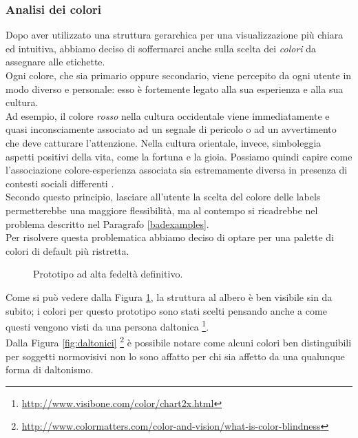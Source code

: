 \documentclass[12pt]{article} %
\begin{document}
\subsubsection{Analisi dei colori}
Dopo aver utilizzato una struttura gerarchica per una visualizzazione più chiara ed intuitiva, abbiamo deciso di soffermarci anche sulla scelta dei \emph{colori} da assegnare alle etichette.\\
Ogni colore, che sia primario oppure secondario, viene percepito da ogni utente in modo diverso e personale: esso è fortemente legato alla sua esperienza e alla sua cultura.\\
Ad esempio, il colore \emph{rosso} nella cultura occidentale viene immediatamente e quasi inconsciamente associato ad un segnale di pericolo o ad un avvertimento che deve catturare l'attenzione. Nella cultura orientale, invece, simboleggia aspetti positivi della vita, come la fortuna e la gioia. Possiamo quindi capire come l'associazione colore-esperienza associata sia estremamente diversa in presenza di contesti sociali differenti \cite{thesis}.\\
Secondo questo principio, lasciare all'utente la scelta del colore delle labels permetterebbe una maggiore flessibilità, ma al contempo si ricadrebbe nel problema descritto nel Paragrafo \ref{badexamples}.\\
Per risolvere questa problematica abbiamo deciso di optare per una palette di colori di default più ristretta.

\begin{figure}[H] 
\caption{Prototipo ad alta fedeltà definitivo.}
\label{fig:finale}
\end{figure}

Come si può vedere dalla Figura \ref{fig:finale}, la struttura al albero è ben visibile sin da subito; i colori per questo prototipo sono stati scelti pensando anche a come questi vengono visti da una persona daltonica \footnote{\url{http://www.visibone.com/color/chart2x.html}}.\\
Dalla Figura \ref{fig:daltonici} \footnote{\url{http://www.colormatters.com/color-and-vision/what-is-color-blindness}} è possibile notare come alcuni colori ben distinguibili per soggetti normovisivi non lo sono affatto per chi sia affetto da una qualunque forma di daltonismo.
\end{document}
